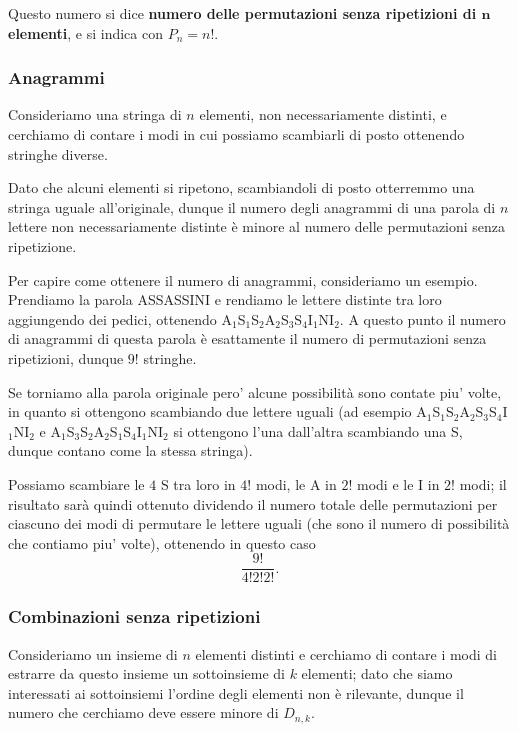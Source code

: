 Questo numero si dice \textbf{numero delle permutazioni senza ripetizioni di $\bm{n}$ elementi}, e si indica con $P_{n} = n!$.

\subsubsection{Anagrammi}

Consideriamo una stringa di $n$ elementi, non necessariamente distinti, e cerchiamo di contare i modi in cui possiamo scambiarli di posto ottenendo stringhe diverse.

Dato che alcuni elementi si ripetono, scambiandoli di posto otterremmo una stringa uguale all'originale, dunque il numero degli anagrammi di una parola di $n$ lettere non necessariamente distinte è minore al numero delle permutazioni senza ripetizione.

Per capire come ottenere il numero di anagrammi, consideriamo un esempio. Prendiamo la parola ASSASSINI e rendiamo le lettere distinte tra loro aggiungendo dei pedici, ottenendo A$_1$S$_1$S$_2$A$_2$S$_3$S$_4$I$_1$NI$_2$. A questo punto il numero di anagrammi di questa parola è esattamente il numero di permutazioni senza ripetizioni, dunque $9!$ stringhe. 

Se torniamo alla parola originale pero' alcune possibilità sono contate piu' volte, in quanto si ottengono scambiando due lettere uguali (ad esempio A$_1$S$_1$S$_2$A$_2$S$_3$S$_4$I$_1$NI$_2$ e A$_1$S$_3$S$_2$A$_2$S$_1$S$_4$I$_1$NI$_2$ si ottengono l'una dall'altra scambiando una S, dunque contano come la stessa stringa). 

Possiamo scambiare le $4$ S tra loro in $4!$ modi, le A in $2!$ modi e le I in $2!$ modi; il risultato sarà quindi ottenuto dividendo il numero totale delle permutazioni per ciascuno dei modi di permutare le lettere uguali (che sono il numero di possibilità che contiamo piu' volte), ottenendo in questo caso \[ 
    \frac{9!}{4!2!2!}
.\]

\subsubsection{Combinazioni senza ripetizioni}

Consideriamo un insieme di $n$ elementi distinti e cerchiamo di contare i modi di estrarre da questo insieme un sottoinsieme di $k$ elementi; dato che siamo interessati ai sottoinsiemi l'ordine degli elementi non è rilevante, dunque il numero che cerchiamo deve essere minore di $D_{n, k}$.

